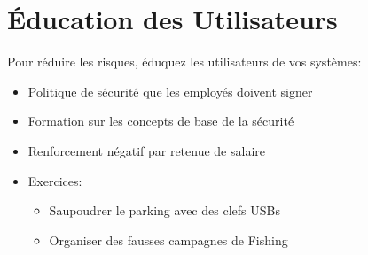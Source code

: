 
\section{Éducation des Utilisateurs}

\begin{frame}

Pour réduire les risques, éduquez les utilisateurs de vos systèmes:\\
\begin{itemize}
    \item Politique de sécurité que les employés doivent signer
    \item Formation sur les concepts de base de la sécurité
    \item Renforcement négatif par retenue de salaire
    \item Exercices:
    \begin{itemize}
        \item Saupoudrer le parking avec des clefs USBs
        \item Organiser des fausses campagnes de Fishing
    \end{itemize}
\end{itemize}

\end{frame}

